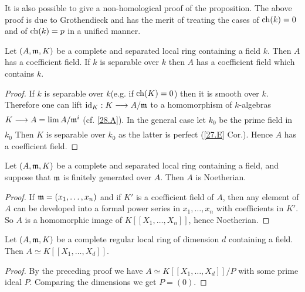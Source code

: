 \documentclass[../main]{subfiles}
\begin{document}
\begin{remark}
 It is also possible to give a non-homological proof of the proposition. The above proof is due to Grothendieck and has the merit of treating the cases of $\operatorname{ch}(k)=0$ and of $\operatorname{ch}(k)=p$ in a unified manner.
\end{remark}
\begin{partheorem}[I.S Cohen]\label{thm:060}
 Let $(A,\mathfrak{m},K)$ be a complete and separated local ring containing a field $k$. Then $A$ has a coefficient field. If $k$ is separable over $k$ then $A$ has a coefficient field which contains $k$.
\end{partheorem}
\begin{proof}
If $k$ is separable over $k$(e.g. if $\operatorname{ch}(K)=0$) then it is smooth over $k$. Therefore one can lift $\id_K: K \varrightarrow{} A/\ideal{m}$ to a homomorphism of $k$-algebras \newline $K \varrightarrow{} A=\lim A/\ideal{m}^i$ (cf. \ref{28.A}). In the general case let $k_0$ be the prime field in $k_0$ Then $K$ is separable over $k_0$ as the latter is perfect (\ref{27.E} Cor.). Hence $A$ has a coefficient field.
\end{proof}
\begin{corollary}\label{cor:28.01}
Let $(A, \mathfrak{m}, K)$ be a complete and separated local ring containing a field, and suppose that $\mathfrak{m}$ is finitely generated over $A$. Then $A$ is Noetherian.
\end{corollary}
\begin{proof}
 If $\mathfrak{m}=(x_1, \dots, x_n)$ and if $K'$ is a coefficient field of $A$, then any element of $A$ can be developed into a formal power series in $x_1, \ldots, x_n$ with coefficients in $K'$. So $A$ is a homomorphic image of $K[[X_1, \ldots, X_n]]$, hence Noetherian.
\end{proof}

\begin{corollary}\label{cor:28.02}
Let $(A, \mathfrak{m}, K)$ be a complete regular local ring of dimension $d$ containing a field. Then $A \simeq K[[X_1, \ldots, X_d]]$.
\end{corollary}
\begin{proof}
 By the preceding proof we have $A \simeq K[[X_1, \ldots, X_d]] / P$ with some prime ideal $P$. Comparing the dimensions we get $P=(0)$.
\end{proof}
\end{document}
